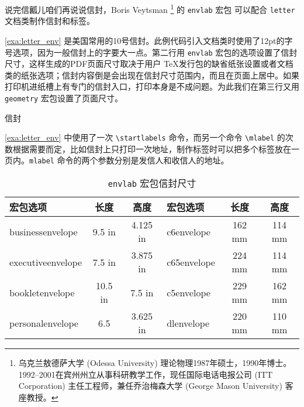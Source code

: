 说完信瓤儿咱们再说说信封，Boris Veytsman\indexVeytsman{} \footnote{乌克兰敖德萨大学 (Odessa University) 理论物理1987年硕士，1990年博士。1992--2001在宾州州立从事科研教学工作，现任国际电话电报公司 (ITT Corporation) 主任工程师，兼任乔治梅森大学 (George Mason University) 客座教授。} 的 \texttt{envlab} 宏包 \citep{Veytsman_1997} 可以配合 \texttt{letter} 文档类制作信封和标签。

\autoref{exa:letter_env} 是美国常用的10号信封。此例代码引入文档类时使用了12pt的字号选项，因为一般信封上的字要大一点。第二行用 \texttt{envlab} 宏包的选项设置了信封尺寸，这样生成的PDF页面尺寸取决于用户 \TeX 发行包的缺省纸张设置或者文档类的纸张选项；信封内容倒是会出现在信封尺寸范围内，而且在页面上居中。如果打印机进纸槽上有专门的信封入口，打印本身是不成问题。为此我们在第三行又用 \texttt{geometry} 宏包设置了页面尺寸。

\begin{example}[h]
\caption{信封}
\label{exa:letter_env}
\end{example}

\autoref{exa:letter_env} 中使用了一次 \verb|\startlabels| 命令，而另一个命令 \verb|\mlabel| 的次数根据需要而定，比如信封上只打印一次地址，制作标签时可以把多个标签放在一页内。\verb|mlabel| 命令的两个参数分别是发信人和收信人的地址。

\begin{table}[htbp]
\centering
\caption{\texttt{envlab} 宏包信封尺寸}
\label{tab:env_sizes}
\begin{tabular}{lcclcc}
    \toprule
    宏包选项          & 长度    & 高度     & 宏包选项    & 长度    & 高度\\
    \midrule
    businessenvelope  & 9.5 in  & 4.125 in & c6envelope  & 162 mm  & 114 mm\\
    executiveenvelope & 7.5 in  & 3.875 in & c65envelope & 224 mm  & 114 mm\\
    bookletenvelope   & 10.5 in & 7.5 in   & c5envelope  & 229 mm  & 162 mm\\
    personalenvelope  & 6.5     & 3.625 in & dlenvelope  & 220 mm  & 110 mm\\ 
    \bottomrule
\end{tabular}
\end{table}

